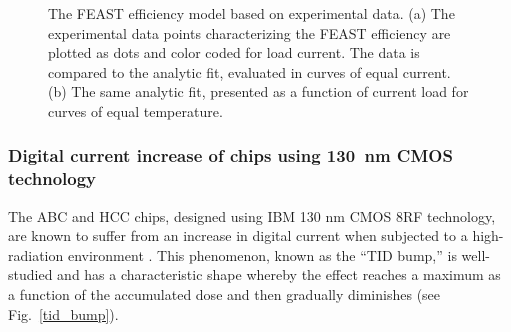 \begin{figure}[ht]
\centering
{}\quad\quad
{}
\caption{The FEAST efficiency model based on experimental data. (a) The experimental data points
characterizing the FEAST efficiency are plotted as dots and color coded for load current. The data is
compared to the analytic fit, evaluated in curves of equal current. (b) The same analytic fit,
presented as a function of current load for curves of equal temperature.
}
\label{fig:feast_eff}
\end{figure}


\subsubsection{Digital current increase of chips using 130~nm CMOS technology}
\label{sec:tid_explanation}

The ABC and HCC chips, designed using IBM 130 nm CMOS 8RF technology, are known to suffer from an
increase in digital current when subjected to a high-radiation environment
\cite{Collaboration:2017mtb}. This phenomenon, known as the ``TID bump,'' is well-studied
\cite{1589217,FACCIO20081000} and has a characteristic shape whereby the effect reaches a maximum
as a function of the accumulated dose and then gradually diminishes (see Fig.~\ref{tid_bump}).

